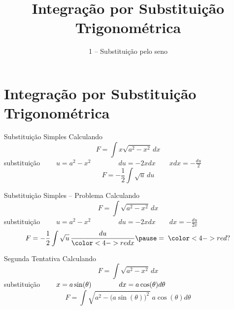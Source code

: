 
\usepackage{integracao_e_series}

\title{Integração por Substituição Trigonométrica}
\subtitle{1 -- Substituição pelo seno}



\addtitle

\section{Integração por Substituição Trigonométrica}

\begin{frame}{Substituição Simples}
  Calculando
  \[
    F = \int x \sqrt{a^2-x^2}\,dx
  \]
  \pause
  substituição
  \(
    \qquad
    u = a^2-x^2
    \qquad\qquad
    du = -2xdx
    \qquad
    xdx = -\frac{du}{2}
  \)
  \pause
  \[
    F = -\frac{1}{2}\int \sqrt{u}\,du
  \]
\end{frame}

\begin{frame}{Substituição Simples -- Problema}
  Calculando
  \[
    F = \int \sqrt{a^2-x^2}\,dx
  \]
  \pause
  substituição
  \(
    \qquad
    u = a^2-x^2
    \qquad\qquad
    du = -2xdx
    \qquad
    dx = -\frac{du}{2x}
  \)
  \pause
  \[
    F
    = -\frac{1}{2}\int \sqrt{u} \,\frac{du}{{\color<4->{red}x}}
    \pause
    =\; {\color<4->{red}?}
  \]
\end{frame}

\begin{frame}{Segunda Tentativa}
  Calculando
  \[
    F = \int \sqrt{a^2-x^2}\,dx
  \]
  \pause
  substituição
  \(
    \qquad
    x = a\sin(\theta)
    \qquad\qquad
    dx = a\cos(\theta)d\theta
    \vphantom{\frac{du}{2}}
  \)
  \pause
  \[
    F = \int \sqrt{a^2 - \big(a\sin(\theta)\big)^2\,} \,a\cos(\theta)d\theta
  \]
\end{frame}

